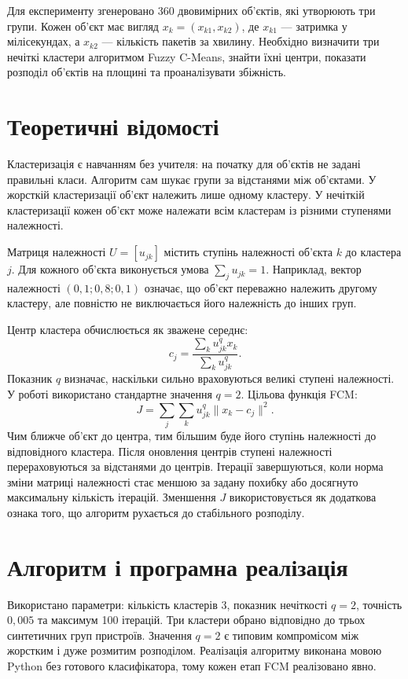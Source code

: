 \documentclass[12pt,a4paper]{article}
\begin{document}
Для експерименту згенеровано 360 двовимірних об'єктів, які утворюють три групи. Кожен об'єкт має вигляд $x_k=(x_{k1},x_{k2})$, де $x_{k1}$ --- затримка у мілісекундах, а $x_{k2}$ --- кількість пакетів за хвилину. Необхідно визначити три нечіткі кластери алгоритмом Fuzzy C-Means, знайти їхні центри, показати розподіл об'єктів на площині та проаналізувати збіжність.

\section{Теоретичні відомості}
Кластеризація є навчанням без учителя: на початку для об'єктів не задані правильні класи. Алгоритм сам шукає групи за відстанями між об'єктами. У жорсткій кластеризації об'єкт належить лише одному кластеру. У нечіткій кластеризації кожен об'єкт може належати всім кластерам із різними ступенями належності.

Матриця належності $U=[u_{jk}]$ містить ступінь належності об'єкта $k$ до кластера $j$. Для кожного об'єкта виконується умова $\sum_j u_{jk}=1$. Наприклад, вектор належності $(0{,}1;0{,}8;0{,}1)$ означає, що об'єкт переважно належить другому кластеру, але повністю не виключається його належність до інших груп.

Центр кластера обчислюється як зважене середнє:
\begin{equation}c_j=\frac{\sum_k u_{jk}^q x_k}{\sum_k u_{jk}^q}.\end{equation}
Показник $q$ визначає, наскільки сильно враховуються великі ступені належності. У роботі використано стандартне значення $q=2$. Цільова функція FCM:
\begin{equation}J=\sum_j\sum_k u_{jk}^q\lVert x_k-c_j\rVert^2.\end{equation}
Чим ближче об'єкт до центра, тим більшим буде його ступінь належності до відповідного кластера. Після оновлення центрів ступені належності перераховуються за відстанями до центрів. Ітерації завершуються, коли норма зміни матриці належності стає меншою за задану похибку або досягнуто максимальну кількість ітерацій. Зменшення $J$ використовується як додаткова ознака того, що алгоритм рухається до стабільного розподілу.

\section{Алгоритм і програмна реалізація}
Використано параметри: кількість кластерів $3$, показник нечіткості $q=2$, точність $0{,}005$ та максимум 100 ітерацій. Три кластери обрано відповідно до трьох синтетичних груп пристроїв. Значення $q=2$ є типовим компромісом між жорстким і дуже розмитим розподілом. Реалізація алгоритму виконана мовою Python без готового класифікатора, тому кожен етап FCM реалізовано явно.
\end{document}
